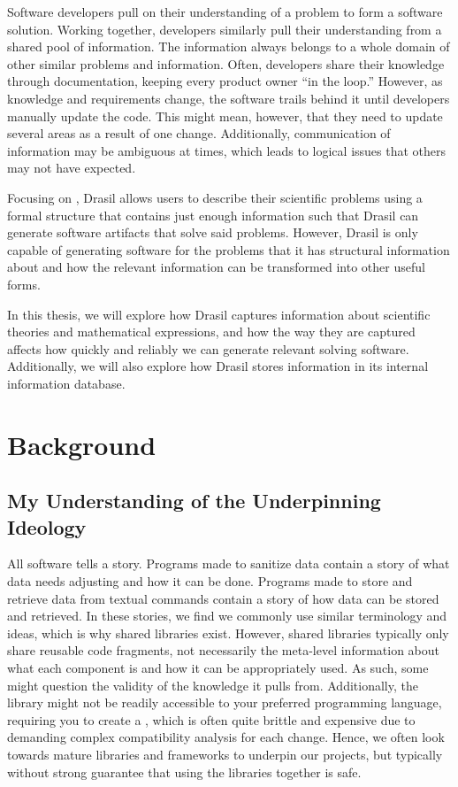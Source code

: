 Software developers pull on their understanding of a problem to form a software
solution. Working together, developers similarly pull their understanding from a
shared pool of information. The information always belongs to a whole domain of
other similar problems and information. Often, developers share their knowledge
through documentation, keeping every product owner ``in the loop.'' However, as
knowledge and requirements change, the software trails behind it until
developers manually update the code. This might mean, however, that they need to
update several areas as a result of one change. Additionally, communication of
information may be ambiguous at times, which leads to logical issues that others
may not have expected.

Focusing on , Drasil allows users to describe their scientific problems
using a formal  structure that contains just enough information such
that Drasil can generate software artifacts that solve said problems. However,
Drasil is only capable of generating software for the problems that it has
structural information about and how the relevant information can be transformed
into other useful forms.

In this thesis, we will explore how Drasil captures information about scientific
theories and mathematical expressions, and how the way they are captured affects
how quickly and reliably we can generate relevant solving software.
Additionally, we will also explore how Drasil stores information in its internal
information database.

\section{Background}
\label{sec:intro:background}

\subsection{My Understanding of the Underpinning Ideology}

All software tells a story. Programs made to sanitize data contain a story of
what data needs adjusting and how it can be done. Programs made to store and
retrieve data from textual commands contain a story of how data can be stored
and retrieved. In these stories, we find we commonly use similar terminology and
ideas, which is why shared libraries exist. However, shared libraries typically
only share reusable code fragments, not necessarily the meta-level information
about what each component is and how it can be appropriately used. As such, some
might question the validity of the knowledge it pulls from. Additionally, the
library might not be readily accessible to your preferred programming language,
requiring you to create a , which is often quite brittle and expensive
due to demanding complex compatibility analysis for each change. Hence, we often
look towards mature libraries and frameworks to underpin our projects, but
typically without strong guarantee that using the libraries together is safe.

